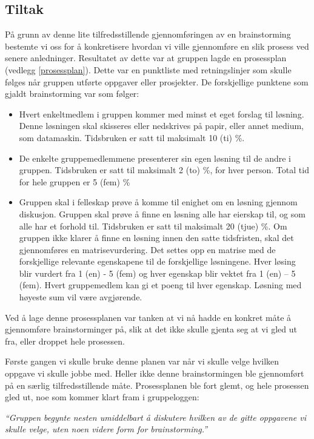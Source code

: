 \subsection{Tiltak}
På grunn av denne lite tilfredsstillende gjennomføringen av en brainstorming bestemte vi oss for å konkretisere hvordan vi ville gjennomføre en slik prosess ved senere anledninger. Resultatet av dette var at gruppen lagde en prosessplan (vedlegg \ref{prosessplan}). Dette var en punktliste med retningslinjer som skulle følges når gruppen utførte oppgaver eller prosjekter. De forskjellige punktene som gjaldt brainstorming var som følger:
\begin{itemize}
\item Hvert enkeltmedlem i gruppen kommer med minst et eget forslag til løsning. Denne løsningen skal skisseres eller nedskrives på papir, eller annet medium, som datamaskin. Tidsbruken er satt til maksimalt 10 (ti) \%.

\item De enkelte gruppemedlemmene presenterer sin egen løsning til de andre i gruppen. Tidsbruken er satt til maksimalt 2 (to) \%, for hver person. Total tid for hele gruppen er 5 (fem) \%
 
\item Gruppen skal i felleskap prøve å komme til enighet om en løsning gjennom diskusjon. Gruppen skal prøve å finne en løsning alle har eierskap til, og som alle har et forhold til. Tidsbruken er satt til maksimalt 20 (tjue) \%. Om gruppen ikke klarer å finne en løsning innen den satte tidsfristen, skal det gjennomføres en matrisevurdering. Det settes opp en matrise med de forskjellige relevante egenskapene til de forskjellige løsningene. Hver løsing blir vurdert fra 1 (en) - 5 (fem) og hver egenskap blir vektet fra 1 (en) – 5 (fem). Hvert gruppemedlem kan gi et poeng til hver egenskap. Løsning med høyeste sum vil være avgjørende.
\end{itemize}
Ved å lage denne prosessplanen var tanken at vi nå hadde en konkret måte å gjennomføre brainstorminger på, slik at det ikke skulle gjenta seg at vi gled ut fra, eller droppet hele prosessen.

Første gangen vi skulle bruke denne planen var når vi skulle velge hvilken oppgave vi skulle jobbe med. Heller ikke denne brainstormingen ble gjennomført på en særlig tilfredsstillende måte. Prosessplanen ble fort glemt, og hele prosessen gled ut, noe som kommer klart fram i gruppeloggen:\newline

\emph{“Gruppen begynte nesten umiddelbart å diskutere hvilken av de gitte oppgavene vi skulle velge, uten noen videre form for brainstorming.”} \newline

